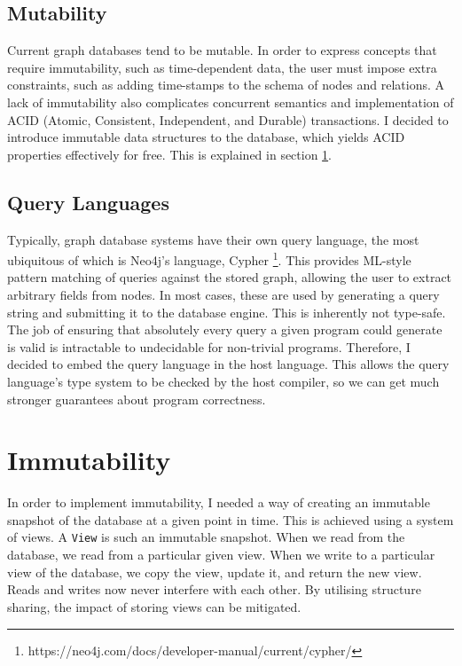\documentclass[12pt,a4paper,twoside,openright]{report}
\newcommand\codeName[1]{\texttt{#1}}
\begin{document}
\subsection{Mutability}
Current graph databases tend to be mutable. In order to express concepts that require immutability, such as time-dependent data, the user must impose extra constraints, such as adding time-stamps to the schema of  nodes and relations. A lack of immutability also complicates concurrent semantics and implementation of ACID (Atomic, Consistent, Independent, and Durable) transactions. I decided to introduce immutable data structures  to the database, which yields ACID properties effectively for free. This is explained in section \ref{immutability}.
\subsection{Query Languages}
Typically, graph database systems have their own query language, the most ubiquitous of which is Neo4j's language, Cypher \footnote{https://neo4j.com/docs/developer-manual/current/cypher/}. This provides ML-style pattern matching of queries against the stored graph, allowing the user to extract arbitrary fields from nodes. In most cases, these are used by generating a query string and submitting it to the database engine. This is inherently not type-safe. The job of ensuring that absolutely every query a given program could generate is valid is intractable to undecidable for non-trivial programs. Therefore, I decided to embed the query language in the host language. This allows the query language's type system to be checked by the host compiler, so we can get much stronger guarantees about program correctness.

\section{Immutability}\label{immutability}
In order to implement immutability, I needed a way of creating an immutable snapshot of the database at a given point in time. This is achieved using a system of views. A \codeName{View} is such an immutable snapshot. When we read from the database, we read from a particular given view. When we write to a particular view of the database, we copy the view, update it, and return the new view. Reads and writes now never interfere with each other. By utilising structure sharing, the impact of storing views can be mitigated.
\end{document}
